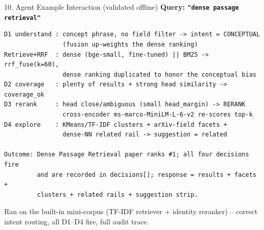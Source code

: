 \documentclass[10pt,aspectratio=169]{beamer}
\begin{document}
\begin{frame}[fragile]{10. Agent Example Interaction (validated offline)}
\textbf{Query: \texttt{"dense passage retrieval"}}
\begin{lstlisting}[basicstyle=\ttfamily\tiny]
D1 understand : concept phrase, no field filter -> intent = CONCEPTUAL
                (fusion up-weights the dense ranking)
Retrieve+RRF  : dense (bge-small, fine-tuned) || BM25 -> rrf_fuse(k=60),
                dense ranking duplicated to honor the conceptual bias
D2 coverage   : plenty of results + strong head similarity -> coverage_ok
D3 rerank     : head close/ambiguous (small head_margin) -> RERANK
                cross-encoder ms-marco-MiniLM-L-6-v2 re-scores top-k
D4 explore    : KMeans/TF-IDF clusters + arXiv-field facets +
                dense-NN related rail -> suggestion = related

Outcome: Dense Passage Retrieval paper ranks #1; all four decisions fire
         and are recorded in decisions[]; response = results + facets +
         clusters + related rails + suggestion strip.
\end{lstlisting}

\scriptsize Ran on the built-in mini-corpus (TF-IDF retriever + identity reranker) -- correct intent routing, all D1--D4 fire, full audit trace.
\end{frame}
\end{document}
